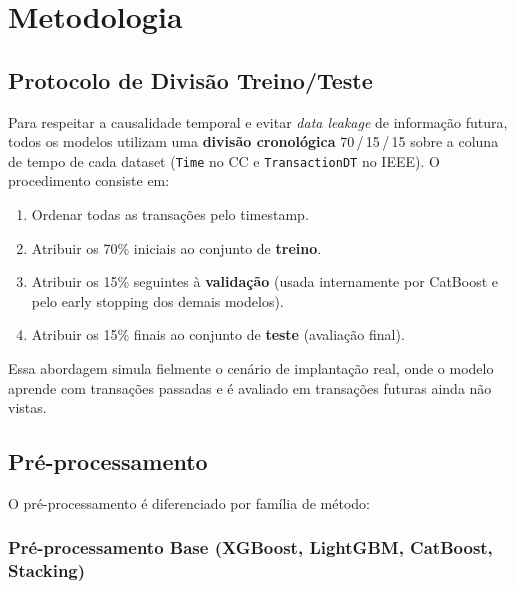\documentclass[12pt,a4paper]{article}
\begin{document}
\section{Metodologia}
\label{sec:metodologia}

\subsection{Protocolo de Divisão Treino/Teste}
\label{sec:split}

Para respeitar a causalidade temporal e evitar \textit{data leakage} de
informação futura, todos os modelos utilizam uma \textbf{divisão cronológica}
70\,/\,15\,/\,15 sobre a coluna de tempo de cada dataset (\texttt{Time} no CC
e \texttt{TransactionDT} no IEEE). O procedimento consiste em:

\begin{enumerate}[nosep]
  \item Ordenar todas as transações pelo timestamp.
  \item Atribuir os 70\% iniciais ao conjunto de \textbf{treino}.
  \item Atribuir os 15\% seguintes à \textbf{validação} (usada internamente
    por CatBoost e pelo early stopping dos demais modelos).
  \item Atribuir os 15\% finais ao conjunto de \textbf{teste} (avaliação final).
\end{enumerate}

Essa abordagem simula fielmente o cenário de implantação real, onde o modelo
aprende com transações passadas e é avaliado em transações futuras ainda não
vistas.

\subsection{Pré-processamento}
\label{sec:preprocessing}

O pré-processamento é diferenciado por família de método:

\subsubsection{Pré-processamento Base (XGBoost, LightGBM, CatBoost, Stacking)}
\end{document}
